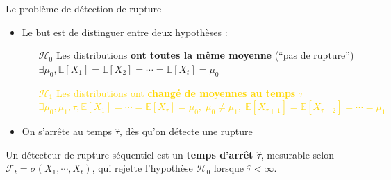 \documentclass[11pt,french,ignorenonframetext,]{beamer}
\begin{document}
\begin{frame}{Le problème de détection de rupture}


  \begin{itemize}

    \item \alert{Le but} est de distinguer entre deux hypothèses :
    \begin{itemize}
      \item[\textcolor{deeppurple}{$\mathcal{H}_0$}] \textcolor{deeppurple}{Les distributions \textbf{ont toutes la même moyenne} \hfill{} (``pas de rupture'')\\
      $\exists \mu_0, \mathbb{E}[X_1] = \mathbb{E}[X_2] = \cdots = \mathbb{E}[X_t] = \mu_0$}

      \item[\textcolor{gold}{$\mathcal{H}_1$}] \textcolor{gold}{Les distributions ont \textbf{changé de moyennes au temps $\tau$} \\
      $\exists \mu_0, \mu_1, \tau, \mathbb{E}[X_1] = \cdots = \mathbb{E}[X_{\tau}] = \mu_0, \; \mu_0 \neq \mu_1, \; \mathbb{E}[X_{\tau+1}] = \mathbb{E}[X_{\tau+2}] = \cdots = \mu_1$}
    \end{itemize}
    \item On s'arrête au temps $\widehat{\tau}$, dès qu'on détecte une rupture
  \end{itemize}

  \vspace*{20pt}

  \pause
  Un \alert{détecteur de rupture séquentiel} est un \alert{\textbf{temps d'arrêt $\widehat{\tau}$}},
  mesurable selon $\mathcal{F}_t = \sigma(X_1,\cdots,X_t)$,
  qui rejette l'hypothèse \textcolor{deeppurple}{$\mathcal{H}_0$}
  lorsque $\widehat{\tau} < \infty$.

\end{frame}
\end{document}
